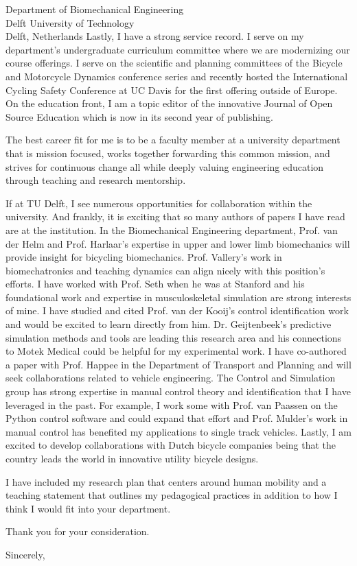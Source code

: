\documentclass{letter}
\begin{document}
\begin{letter}{
  Department of Biomechanical Engineering \\
  Delft University of Technology \\
  Delft, Netherlands
}
Lastly, I have a strong service record. I serve on my department's
undergraduate curriculum committee where we are modernizing our course
offerings. I serve on the scientific and planning committees of the Bicycle and
Motorcycle Dynamics conference series and recently hosted the International
Cycling Safety Conference at UC Davis for the first offering outside of Europe.
On the education front, I am a topic editor of the innovative Journal of Open
Source Education which is now in its second year of publishing.

The best career fit for me is to be a faculty member at a university department
that is mission focused, works together forwarding this common mission, and
strives for continuous change all while deeply valuing engineering education
through teaching and research mentorship.

If at TU Delft, I see numerous opportunities for collaboration within the
university. And frankly, it is exciting that so many authors of papers I have
read are at the institution. In the Biomechanical Engineering department, Prof.
van der Helm and Prof. Harlaar's expertise in upper and lower limb biomechanics
will provide insight for bicycling biomechanics. Prof. Vallery's work in
biomechatronics and teaching dynamics can align nicely with this position's
efforts. I have worked with Prof. Seth when he was at Stanford and his
foundational work and expertise in musculoskeletal simulation are strong
interests of mine. I have studied and cited Prof. van der Kooij's control
identification work and would be excited to learn directly from him.  Dr.
Geijtenbeek's predictive simulation methods and tools are leading this research
area and  his connections to Motek Medical could be helpful for my experimental
work. I have co-authored a paper with Prof. Happee in the Department of
Transport and Planning and will seek collaborations related to vehicle
engineering. The Control and Simulation group has strong expertise in manual
control theory and identification that I have leveraged in the past. For
example, I work some with Prof. van Paassen on the Python control software and
could expand that effort and Prof. Mulder's work in manual control has
benefited my applications to single track vehicles. Lastly, I am excited to
develop collaborations with Dutch bicycle companies being that the country
leads the world in innovative utility bicycle designs.

I have included my research plan that centers around human mobility and a
teaching statement that outlines my pedagogical practices in addition to how I
think I would fit into your department.

Thank you for your consideration.

\closing{Sincerely,}

\end{letter}
\end{document}
